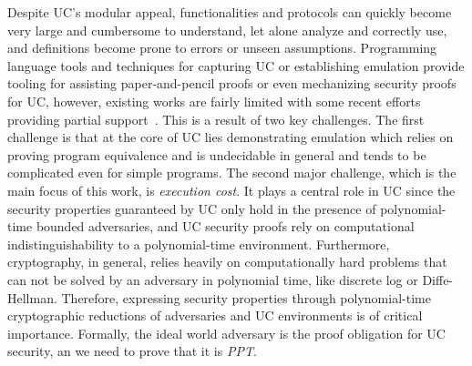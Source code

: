 Despite UC's modular appeal, functionalities and protocols can quickly become very large and cumbersome to understand, let alone analyze and correctly use, and definitions become prone to errors or unseen assumptions.
Programming language tools and techniques for capturing UC or establishing emulation provide tooling for assisting paper-and-pencil proofs or even mechanizing security proofs for UC, however, existing works are fairly limited with some recent efforts providing
partial support~\cite{ilc,easyuc,ipdl,symbolicuc,barbosa}. This is a result of two key challenges.
The first challenge is that at the core of UC lies demonstrating emulation which relies on proving program equivalence and is undecidable in general
and tends to be complicated even for simple programs.
The second major challenge, which is the main focus of this work, is \emph{execution cost}. It plays a central role in UC since the security properties
guaranteed by UC only hold in the presence of polynomial-time bounded adversaries, and UC security proofs rely on computational indistinguishability to a polynomial-time environment. 
Furthermore, cryptography, in general, relies heavily on computationally hard problems that can not be solved by an adversary in polynomial time, like discrete log or Diffe-Hellman. 
Therefore, expressing security properties 
through polynomial-time cryptographic reductions of adversaries and UC environments is of critical importance.
Formally, the ideal world adversary is the proof obligation for UC security, an we need to prove that it is \emph{PPT}.
